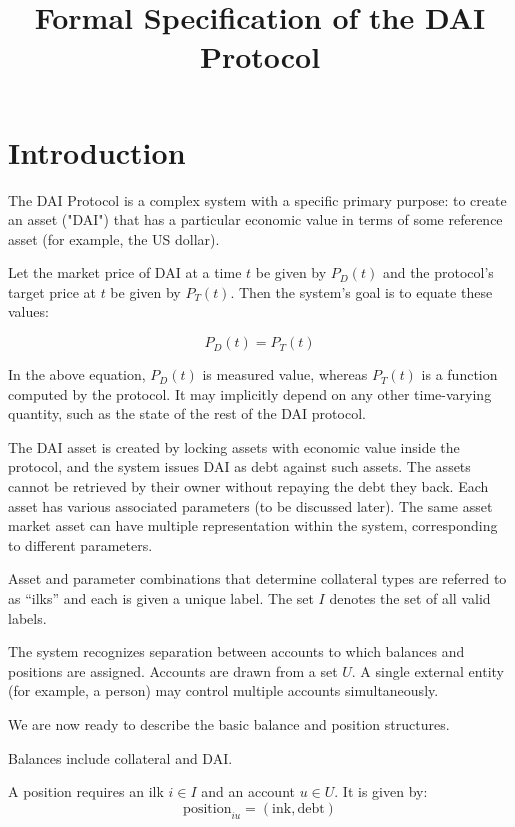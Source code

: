 \documentclass{article}
\begin{document}
\title{Formal Specification of the DAI Protocol}

\maketitle

\section{Introduction}

The DAI Protocol is a complex system with a specific primary purpose: to create an asset ("DAI") that has a particular economic value in terms of some reference asset (for example, the US dollar).

Let the market price of DAI at a time \(t\) be given by \(P_D(t)\) and the protocol's target price at \(t\) be given by \(P_T(t)\). Then the system's goal is to equate these values:

\begin{equation}
    P_D(t) = P_T(t)
\end{equation}

In the above equation, \(P_D(t)\) is measured value, whereas \(P_T(t)\) is a function computed by the protocol. It may implicitly depend on any other time-varying quantity, such as the state of the rest of the
DAI protocol.

The DAI asset is created by locking assets with economic value inside the protocol, and the system issues DAI as debt against such assets. The assets cannot be retrieved by their owner without repaying the debt 
they back. Each asset has various associated parameters (to be discussed later). The same asset market asset can have multiple representation within the system, corresponding to different parameters.

Asset and parameter combinations that determine collateral types are referred to as ``ilks'' and each is given a unique label. The set \(I\) denotes the set of all valid labels.

The system recognizes separation between accounts to which balances and positions are assigned. Accounts are drawn from a set \(U\). A single external entity (for example, a person) may control multiple accounts
simultaneously.

We are now ready to describe the basic balance and position structures.

Balances include collateral and DAI. 

A position requires an ilk \(i \in I\) and an account \(u \in U\). It is given by:
\begin{equation}
    \text{position}_{iu} = (\text{ink}, \text{debt})
\end{equation}
\end{document}
